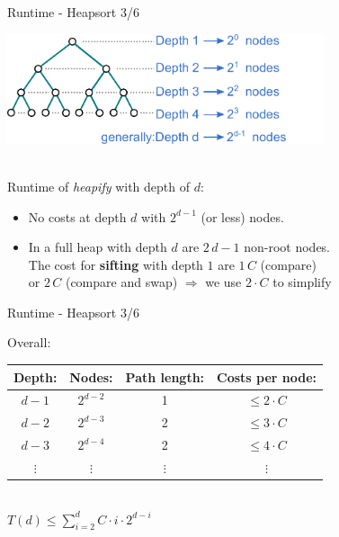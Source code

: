 \documentclass{beamer}
\newcommand{\Mittelblau}[1]{\textcolor{Mittel-Blau}{#1}}
\begin{document}
\begin{frame}{Runtime - Heapsort 3/6}
  \begin{tabl}
  \iitem{4em}\includegraphics[width=0.7\textwidth]{Rolfs-Images/depth-nodes.pdf}
  \end{tabl}\\
  Runtime of \textit{heapify} with depth of $d$:
  \begin{itemize}
    \item
      No costs at depth $d$ with $2^{d - 1}$ (or less) nodes.
    \item<2->
      In a full heap with depth $d$ are $2 \, d - 1$ non-root nodes.\\
      The cost for \textbf{sifting} with depth $1$ are $1 \, C$
      ({\color{Mittel-Blau}compare})\\
      or $2 \, C$ ({\color{Mittel-Blau}compare} and
      {\color{Mittel-Blau}swap}) $\Rightarrow$ we use \Mittelblau{$2\cdot C$} to simplify
  \end{itemize}%

\end{frame}



\begin{frame}{Runtime - Heapsort 3/6}
  \begin{tabl}
  \item Overall:
  \end{tabl}
      \begin{center}%
        \begin{tabular}{c|c|c|c}
          Depth:     & Nodes:    & Path length: & Costs per node:\\
          \hline
          $d - 1$    & $2^{d-2}$     & 1            & $\leq 2 \cdot C$\\
          $d - 2$    & $2^{d-3}$ & 2            & $\leq 3 \cdot C$\\
          $d - 3$    & $2^{d-4}$ & 2            & $\leq 4 \cdot C$\\
          $\vdots$   & $\vdots$  & $\vdots$     & $\vdots$ 
        \end{tabular}\\[3em]
       \quad \Mittelblau{$\displaystyle  T(d) \leq \sum^d_{i=2} C\cdot i \cdot 2^{d-i} $}

    \end{center}%

\end{frame}
\end{document}
